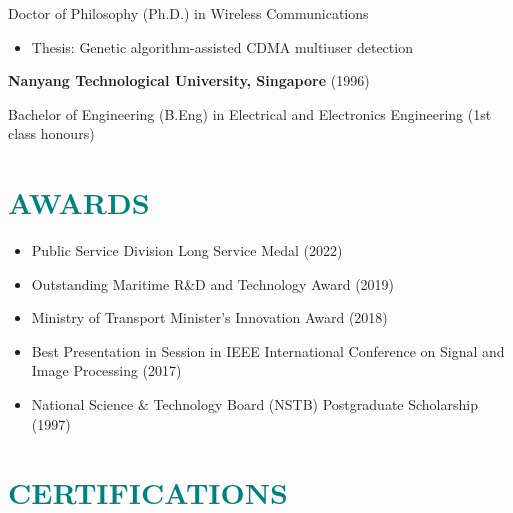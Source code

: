 \documentclass[a4paper, 11pt]{article}
\begin{document}
	{\raggedleft Doctor of Philosophy (Ph.D.) in Wireless Communications}
	
	\vspace{-10pt}
	
	\begin{itemize}[leftmargin=*, itemsep=-1mm]
		
		\item Thesis: Genetic algorithm-assisted CDMA multiuser detection
		
	\end{itemize}
	
	\vspace{3pt}
	
	{\raggedleft \bf Nanyang Technological University, Singapore} (1996)
	
	{\raggedleft Bachelor of Engineering (B.Eng) in Electrical and Electronics Engineering (1st class honours)}
	

\section{\textcolor{teal}{\bf{AWARDS}}}

	\vspace{3pt}
	
	\begin{itemize}[leftmargin=*, itemsep=-1mm]
		
		\item Public Service Division Long Service Medal (2022)
		
		\item Outstanding Maritime R\&D and Technology Award (2019)
		
		\item Ministry of Transport Minister’s Innovation Award (2018)
		
		\item Best Presentation in Session in IEEE International Conference on Signal and Image Processing (2017)
		
		\item National Science \& Technology Board (NSTB) Postgraduate Scholarship (1997)
		
	\end{itemize}
	
	
\section{\textcolor{teal}{\bf{CERTIFICATIONS}}}

	\vspace{3pt}
	
\end{document}
